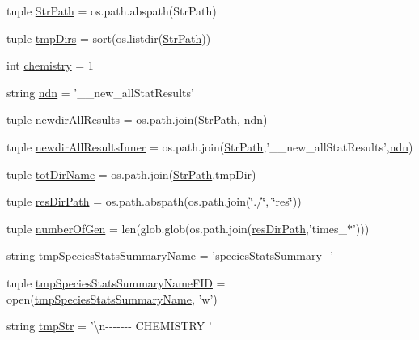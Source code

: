 \begin{DoxyCompactItemize}
\item 
tuple \hyperlink{a00103_a05f0f829ce4df27678aa19d4e5f10c54}{Str\-Path} = os.\-path.\-abspath(Str\-Path)
\item 
tuple \hyperlink{a00103_addf4c61c6afe70a2ea39931695ddc36b}{tmp\-Dirs} = sort(os.\-listdir(\hyperlink{a00103_a05f0f829ce4df27678aa19d4e5f10c54}{Str\-Path}))
\item 
int \hyperlink{a00103_a5459c566e6ccdf02747a3c16089a5593}{chemistry} = 1
\item 
string \hyperlink{a00103_ad2a87ed28d0f42525ce49c390f390298}{ndn} = '\-\_\-\_\-new\-\_\-all\-Stat\-Results'
\item 
tuple \hyperlink{a00103_a4fc28291b7f61ee2fa8969fa7a690ba2}{newdir\-All\-Results} = os.\-path.\-join(\hyperlink{a00103_a05f0f829ce4df27678aa19d4e5f10c54}{Str\-Path}, \hyperlink{a00103_ad2a87ed28d0f42525ce49c390f390298}{ndn})
\item 
tuple \hyperlink{a00103_ae77a5ce35739a29f29f9df698d91f1c9}{newdir\-All\-Results\-Inner} = os.\-path.\-join(\hyperlink{a00103_a05f0f829ce4df27678aa19d4e5f10c54}{Str\-Path},'\-\_\-\_\-new\-\_\-all\-Stat\-Results',\hyperlink{a00103_ad2a87ed28d0f42525ce49c390f390298}{ndn})
\item 
tuple \hyperlink{a00103_aa71c948cf1d0699207eafcd30beb394e}{tot\-Dir\-Name} = os.\-path.\-join(\hyperlink{a00103_a05f0f829ce4df27678aa19d4e5f10c54}{Str\-Path},tmp\-Dir)
\item 
tuple \hyperlink{a00103_a2c1728d3ec9815ec7cf41653e953524c}{res\-Dir\-Path} = os.\-path.\-abspath(os.\-path.\-join(\char`\"{}./\char`\"{}, \char`\"{}res\char`\"{}))
\item 
tuple \hyperlink{a00103_acceae37ca98ccf6dc25c9f538fda386f}{number\-Of\-Gen} = len(glob.\-glob(os.\-path.\-join(\hyperlink{a00103_a2c1728d3ec9815ec7cf41653e953524c}{res\-Dir\-Path},'times\-\_\-$\ast$')))
\item 
string \hyperlink{a00103_aceab16acbf85893dcacfcfd921c9da12}{tmp\-Species\-Stats\-Summary\-Name} = 'species\-Stats\-Summary\-\_\-'
\item 
tuple \hyperlink{a00103_a57b362cf15dda461a59c719a92177c3a}{tmp\-Species\-Stats\-Summary\-Name\-F\-I\-D} = open(\hyperlink{a00103_aceab16acbf85893dcacfcfd921c9da12}{tmp\-Species\-Stats\-Summary\-Name}, 'w')
\item 
string \hyperlink{a00103_a81ab8133517c53adfcdf8129e24cf5d0}{tmp\-Str} = '\textbackslash{}n-\/-\/-\/-\/-\/-\/-\/ C\-H\-E\-M\-I\-S\-T\-R\-Y '
\item 

\end{DoxyCompactItemize}
